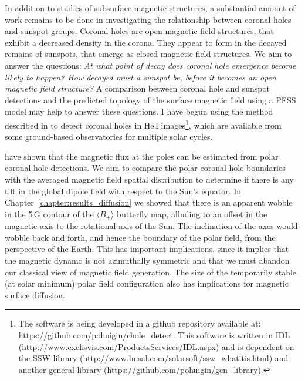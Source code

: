 
In addition to studies of subsurface magnetic structures, a substantial amount of work remains to be done in investigating the relationship between coronal holes and sunspot groups. Coronal holes are open magnetic field structures, that exhibit a decreased density in the corona. They appear to form in the decayed remains of sunspots, that emerge as closed magnetic field structures. We aim to answer the questions: \emph{At what point of decay does coronal hole emergence become likely to happen? How decayed must a sunspot be, before it becomes an open magnetic field structure?} A comparison between coronal hole and sunspot detections and the predicted topology of the surface magnetic field using a PFSS model may help to answer these questions. I have begun using the method described in \citet{Henney:2005} to detect coronal holes in He\,I images\footnote{The software is being developed in a github repository available at: \url{https://github.com/pohuigin/chole\_detect}. This software is written in IDL (\url{http://www.exelisvis.com/ProductsServices/IDL.aspx}) and is dependent on the SSW library (\url{http://www.lmsal.com/solarsoft/ssw\_whatitis.html}) and another general library (\url{https://github.com/pohuigin/gen\_library}).}, which are available from some ground-based observatories for multiple solar cycles. 

\citet{Harvey:2002} have shown that the magnetic flux at the poles can be estimated from polar coronal hole detections. We aim to compare the polar coronal hole boundaries with the averaged magnetic field spatial distribution to determine if there is any tilt in the global dipole field with respect to the Sun's equator. In Chapter~\ref{chapter:results_diffusion} we showed that there is an apparent wobble in the 5\,G contour of the $\langle B_+ \rangle$ butterfly map, alluding to an offset in the magnetic axis to the rotational axis of the Sun. The inclination of the axes would wobble back and forth, and hence the boundary of the polar field, from the perspective of the Earth. This has important implications, since it implies that the magnetic dynamo is not azimuthally symmetric and that we must abandon our classical view \citep{Parker:1955} of magnetic field generation. The size of the temporarily stable (at solar minimum) polar field configuration also has implications for magnetic surface diffusion.

